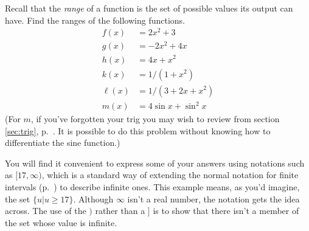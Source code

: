 Recall that the \emph{range} of a function is the set of possible values its
output can have.
Find the ranges of the following functions.
\begin{align*}
  f(x) &= 2x^2+3 \\
  g(x) &= -2x^2+4x \\
  h(x) &= 4x +x^2\\
  k(x) &= 1/(1+x^2)\\
  \ell(x) &= 1/(3+2x+x^2)\\
  m(x) &= 4\sin x + \sin^2 x 
\end{align*}
(For $m$, if you've forgotten your trig you may wish to review
from section \ref{sec:trig}, p.~\pageref{sec:trig}. It is possible
to do this problem without knowing how to differentiate the sine
function.)

You will find it convenient to express some of your answers using
notations such as $[17,\infty)$, which is a standard way of extending
the normal notation for finite intervals (p.~\pageref{interval-notation})
to describe infinite ones. This example means, as you'd
imagine, the set $\{u|u\ge 17\}$. Although $\infty$ isn't
a real number, the notation gets the idea across. The use of the $)$
rather than a $]$ is to show that there isn't a member of the set
whose value is infinite.
